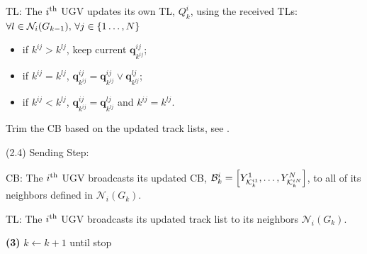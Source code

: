 \begin{algorithm}
\begin{algorithmic}
			TL: The $i^\text{th}$ UGV updates its own TL, $Q^i_k$, using the received TLs: $\forall l\in \mathcal{N}_i(G_{k-1}),\,\forall j\in \left\lbrace 1\dots,N\right\rbrace$
			\begin{itemize} 
				\item if $k^{ij}>k^{lj}$, keep current $\mathbf{q}^{ij}_{k^{ij}}$;
				\item if $k^{ij}=k^{lj}$, $\mathbf{q}^{ij}_{k^{ij}}=\mathbf{q}^{ij}_{k^{ij}} \lor \mathbf{q}^{lj}_{k^{lj}}$;  
				\item if $k^{ij}<k^{lj}$, $\mathbf{q}^{ij}_{k^{ij}}=\mathbf{q}^{lj}_{k^{lj}}$ and $k^{ij}=k^{lj}$.
			\end{itemize}
			
			Trim the CB based on the updated track lists, see . 
			
			\State (2.4) Sending Step:
			
			CB: The $i^\text{th}$ UGV broadcasts its updated CB, \small$\mathcal{B}^i_k=\left[Y^1_{\mathcal{K}^{i1}_{k}},\dots,Y^N_{\mathcal{K}^{iN}_{k}}\right]$\normalsize, to all of its neighbors defined in $\mathcal{N}_i(G_k)$.
			
			TL: The $i^\text{th}$ UGV broadcasts its updated track list to its neighbors $\mathcal{N}_i(G_k)$.
			
			\State \textbf{(3)} $k\leftarrow k+1$ until stop
		\end{algorithmic}
	\end{algorithm}
	
	\medskip
	
